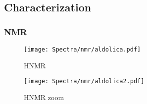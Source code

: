\documentclass[../Master.tex]{subfiles}
\begin{document}
\subsection{Characterization}
\subsubsection{NMR}

\begin{figure}[h!]
	\centering
	\texttt{[image: Spectra/nmr/aldolica.pdf]}
	\caption{HNMR}
\end{figure}

\begin{figure}[h!]
	\centering
	\texttt{[image: Spectra/nmr/aldolica2.pdf]}
	\caption{HNMR zoom}
\end{figure}
\end{document}
